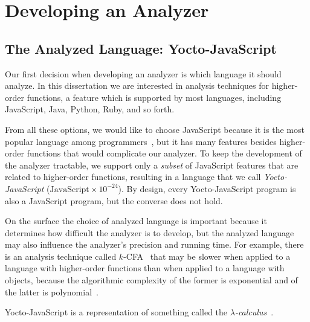 \documentclass[12pt, oneside]{book}
\begin{document}
\chapter{Developing an Analyzer}


\section{The Analyzed Language: Yocto-JavaScript}
\label{The Analyzed Language: Yocto-JavaScript}

Our first decision when developing an analyzer is which language it should analyze. In this dissertation we are interested in analysis techniques for higher-order functions, a feature which is supported by most languages, including JavaScript, Java, Python, Ruby, and so forth.

From all these options, we would like to choose JavaScript because it is the most popular language among programmers~\cite{stack-overflow-developer-survey, jet-brains-developer-survey}, but it has many features besides higher-order functions that would complicate our analyzer. To keep the development of the analyzer tractable, we support only a \emph{subset} of JavaScript features that are related to higher-order functions, resulting in a language that we call \emph{Yocto-JavaScript} ($\mathrm{JavaScript} \times 10^{-24}$). By design, every Yocto-JavaScript program is also a JavaScript program, but the converse does not hold.

\begin{mdframed}[frametitle = {Advanced}]
On the surface the choice of analyzed language is important because it determines how difficult the analyzer is to develop, but the analyzed language may also influence the analyzer’s precision and running time. For example, there is an analysis technique called $k$-CFA~\cite{k-cfa} that may be slower when applied to a language with higher-order functions than when applied to a language with objects, because the algorithmic complexity of the former is exponential and of the latter is polynomial~\cite{m-cfa}.
\end{mdframed}

\begin{mdframed}[frametitle = {Technical Terms}]
Yocto-JavaScript is a representation of something called the \emph{$\lambda$-calculus}~\cite[§~6]{understanding-computation}.
\end{mdframed}
\end{document}
